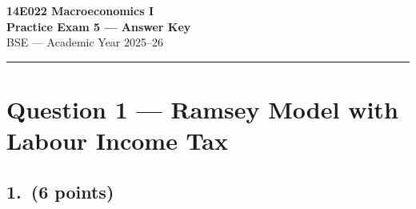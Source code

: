 \documentclass[a4paper,11pt]{article}
\begin{document}

\begin{center}
    {\LARGE \textbf{14E022 Macroeconomics I}}\\[6pt]
    {\Large \textbf{Practice Exam 5 --- Answer Key}}\\[8pt]
    {\large BSE --- Academic Year 2025--26}
\end{center}

\noindent\rule{\textwidth}{0.4pt}

\section{Question 1 --- Ramsey Model with Labour Income Tax}

\subsection*{1.\ (6 points)}
\end{document}
